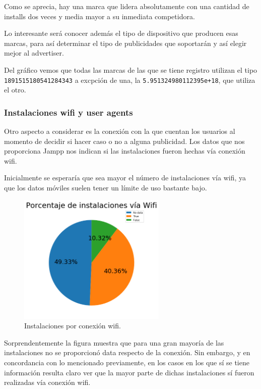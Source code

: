 \documentclass[a4paper, 12pt]{article}
\begin{document}
		Como se aprecia, hay una marca que lidera absolutamente con una cantidad de installs dos veces y media mayor a su inmediata competidora.

		Lo interesante será conocer además el tipo de dispositivo que producen esas marcas, para así determinar el tipo de publicidades que soportarán y así elegir mejor al advertiser.

		Del gráfico vemos que todas las marcas de las que se tiene registro utilizan el tipo \texttt{1891515180541284343} a excpción de una, la \texttt{5.951324980112395e+18}, que utiliza el otro.

	\subsubsection{Instalaciones wifi y user agents}

		Otro aspecto a considerar es la conexión con la que cuentan los usuarios al momento de decidir si hacer caso o no a alguna publicidad. Los datos que nos proporciona Jampp nos indican si las instalaciones fueron hechas vía conexión wifi.

		Inicialmente se esperaría que sea mayor el número de instalaciones vía wifi, ya que los datos móviles suelen tener un límite de uso bastante bajo.

		\FloatBarrier
		\begin{figure}[h]
			\centering
			\includegraphics[width=200pt]{images/installs/Wifi.png}
			\caption{Instalaciones por conexión wifi.}
		\end{figure}
		\FloatBarrier

		Sorprendentemente la figura muestra que para una gran mayoría de las instalaciones no se proporcionó data respecto de la conexión. Sin embargo, y en concordancia con lo mencionado previamente, en los casos en los que sí se tiene información resulta claro ver que la mayor parte de dichas instalaciones sí fueron realizadas vía conexión wifi.
\end{document}

